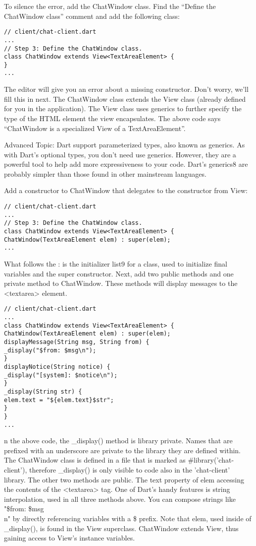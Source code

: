 To silence the error, add the ChatWindow class. Find the “Define the ChatWindow class” comment and add the following class:

\begin{verbatim}
// client/chat-client.dart
...
// Step 3: Define the ChatWindow class.
class ChatWindow extends View<TextAreaElement> {
}
...
\end{verbatim}

The editor will give you an error about a missing constructor. Don't worry, we'll fill this in next. The ChatWindow class extends the View class (already defined for you in the application). The View class uses generics to further specify the type of the HTML element the view encapsulates. The above code says “ChatWindow is a specialized View of a TextAreaElement”.

Advanced Topic: Dart support parameterized types, also known as generics. As with Dart’s optional types, you don’t need use generics. However, they are a powerful tool to help add more expressiveness to your code. Dart’s generics8 are probably simpler than those found in other mainstream languages.

Add a constructor to ChatWindow that delegates to the constructor from View:

\begin{verbatim}
// client/chat-client.dart
...
// Step 3: Define the ChatWindow class.
class ChatWindow extends View<TextAreaElement> {
ChatWindow(TextAreaElement elem) : super(elem);
...
\end{verbatim}

What follows the : is the initializer list9 for a class, used to initialize final variables and the super constructor. Next, add two public methods and one private method to ChatWindow. These methods will display messages to the <textarea> element.

\begin{verbatim}
// client/chat-client.dart
...
class ChatWindow extends View<TextAreaElement> {
ChatWindow(TextAreaElement elem) : super(elem);
displayMessage(String msg, String from) {
_display("$from: $msg\n");
}
displayNotice(String notice) {
_display("[system]: $notice\n");
}
_display(String str) {
elem.text = "${elem.text}$str";
}
}
...
\end{verbatim}

n the above code, the \_display() method is library private. Names that are prefixed with an underscore are private to the library they are defined within. The ChatWindow class is defined in a file that is marked as \#library('chat-client'), therefore \_display() is only visible to code also in the 'chat-client' library. The other two methods are public.
The text property of elem accessing the contents of the <textarea> tag.
One of Dart’s handy features is string interpolation, used in all three methods above. You can compose strings like "\$from: \$msg\\n" by directly referencing variables with a \$ prefix. Note that elem, used inside of \_display(), is found in the View superclass. ChatWindow extends View, thus gaining access to View's instance variables.

